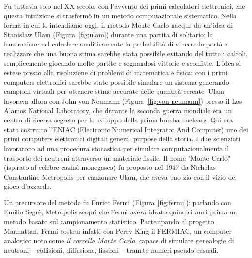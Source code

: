 Fu tuttavia solo nel XX secolo, con l'avvento dei primi calcolatori elettronici, che questa intuizione si trasformò in un metodo computazionale sistematico. Nella forma in cui lo intendiamo oggi, il metodo Monte Carlo nacque da un'idea di Stanisław Ulam (Figura~\ref{fig:ulam}) durante una partita di solitario: la frustrazione nel calcolare analiticamente la probabilità di vincere lo portò a realizzare che una buona stima sarebbe stata possibile evitando del tutto i calcoli, semplicemente giocando molte partite e segnandosi vittorie e sconfitte. L'idea si estese presto alla risoluzione di problemi di matematica e fisica: con i primi computers elettronici sarebbe stato possibile simulare un sistema generando campioni virtuali per ottenere stime accurate delle quantità cercate. Ulam lavorava allora con John von Neumann (Figura~\ref{fig:von-neumann}) presso il Los Alamos National Laboratory, che durante la seconda guerra mondiale era un centro di ricerca segreto per lo sviluppo della prima bomba nucleare. Qui era stato costruito l'ENIAC (Electronic Numerical Integrator And Computer) uno dei primi computers elettronici digitali general purpose della storia. I due scienziati lavorarono ad una procedura stocastica per simulare computazionalmente il trasporto dei neutroni attraverso un materiale fissile. Il nome "Monte Carlo" (ispirato al celebre casinò monegasco) fu proposto nel 1947 da Nicholas Constantine Metropolis \cite{metropolis1987beginning} per canzonare Ulam, che aveva uno zio con il vizio del gioco d'azzardo.

Un precursore del metodo fu Enrico Fermi (Figura~\ref{fig:fermi}): parlando con Emilio Segrè, Metropolis scoprì che Fermi aveva ideato quindici anni prima un metodo basato sul campionamento statistico. Partecipando al progetto Manhattan, Fermi costruì infatti con Percy King il FERMIAC, un computer analogico noto come \textit{il carrello Monte Carlo}, capace di simulare genealogie di neutroni -- collisioni, diffusione, fissioni -- tramite numeri pseudo-casuali.


